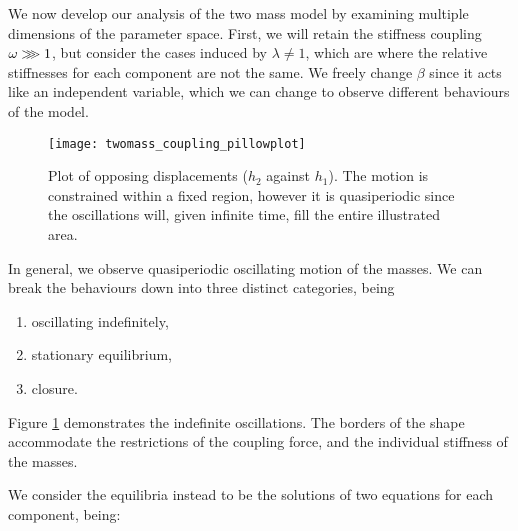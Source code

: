 \documentclass{article}
\begin{document}

We now develop our analysis of the two mass model by examining multiple dimensions of the parameter space.
First, we will retain the stiffness coupling \(\omega \gggtr 1\),
but consider the cases induced by \(\lambda \ne 1\), which are where the relative stiffnesses for each component are not the same.
We freely change \(\beta\) since it acts like an independent variable, which we can change to observe different behaviours of the model.


\begin{figure}
    \centering
    \texttt{[image: twomass\_coupling\_pillowplot]}
    \caption{
        Plot of opposing displacements ($h_2$ against $h_1$). The motion is constrained within a fixed region,
        however it is quasiperiodic since the oscillations will, given infinite time, fill the entire illustrated area.
    }
    \label{fig:twomass_quasiperiodic}
\end{figure}

In general, we observe quasiperiodic oscillating motion of the masses.
We can break the behaviours down into three distinct categories, being
\begin{enumerate}
    \item oscillating indefinitely,
    \item stationary equilibrium,
    \item closure.
\end{enumerate} 
Figure \ref{fig:twomass_quasiperiodic} demonstrates the indefinite oscillations. 
The borders of the shape accommodate the restrictions of the coupling force,
and the individual stiffness of the masses.


We consider the equilibria instead to be the solutions of two equations for each component, being:
\end{document}
